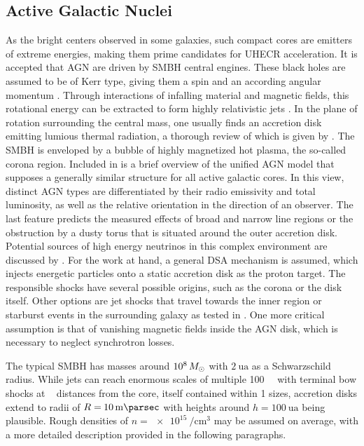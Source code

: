 \subsection{Active Galactic Nuclei}
\label{sub:nuclei}

As the bright centers observed in some galaxies, such compact cores are emitters of extreme energies, making them prime
candidates for UHECR acceleration. It is accepted that AGN are driven by SMBH central engines. These black holes are assumed
to be of Kerr type, giving them a spin and an according angular momentum \cite{Visser_2008}. Through interactions of
infalling material and magnetic fields, this rotational energy can be extracted to form highly relativistic jets \cite{Blandford_2019}.
In the plane of rotation surrounding the central mass, one usually finds an accretion disk emitting lumious thermal radiation,
a thorough review of which is given by \cite{Abramowicz_2013}. The SMBH is enveloped by a bubble of highly magnetized
hot plasma, the so-called corona region. Included in \cite{Beckmann_2013} is a brief overview of the unified AGN model that
supposes a generally similar structure for all active galactic cores. In this view, distinct AGN types are differentiated
by their radio emissivity and total luminosity, as well as the relative orientation in the direction of an observer. The
last feature predicts the measured effects of broad and narrow line regions or the obstruction by a dusty torus that is situated
around the outer accretion disk. Potential sources of high energy neutrinos in this complex environment are discussed by \cite{Murase_2023}.
For the work at hand, a general DSA mechanism is assumed, which injects energetic particles onto a static accretion disk as the proton target.
The responsible shocks have several possible origins, such as the corona or the disk itself. Other options are jet shocks that travel
towards the inner region or starburst events in the surrounding galaxy as tested in \cite{Eichmann_2022}. One more critical assumption
is that of vanishing magnetic fields inside the AGN disk, which is necessary to neglect synchrotron losses.

The typical SMBH has masses around $\num{e8} \kern+1.5pt M_\odot$ with $\qty{2}{\astronomicalunit}$ as a Schwarzschild radius. While
jets can reach enormous scales of multiple \qty{100}{\kilo\parsec} with terminal bow shocks at \unit{\mega\parsec} distances from the
core, itself contained within \qty{1}{\parsec} sizes, accretion disks extend to radii of $R = \kern-0.5pt \qty{10}{\milli\parsec}$
with heights around $h = \qty{100}{\astronomicalunit}$ being plausible. Rough densities of $n = \qty{e15}{\per\centi\meter\cubed}$
may be assumed on average, with a more detailed description provided in the following paragraphs.



